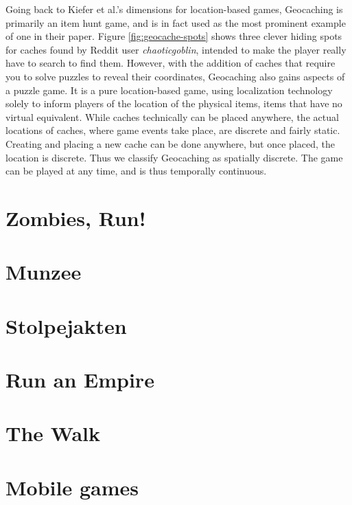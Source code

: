 Going back to Kiefer et al.'s \cite{kiefer2006systematically} dimensions for location-based games, Geocaching is primarily an item hunt game, and is in fact used as the most prominent example of one in their paper. Figure \ref{fig:geocache-spots} shows three clever hiding spots for caches found by Reddit user \emph{chaoticgoblin}, intended to make the player really have to search to find them. However, with the addition of caches that require you to solve puzzles to reveal their coordinates, Geocaching also gains aspects of a puzzle game. It is a pure location-based game, using localization technology solely to inform players of the location of the physical items, items that have no virtual equivalent. While caches technically can be placed anywhere, the actual locations of caches, where game events take place, are discrete and fairly static. Creating and placing a new cache can be done anywhere, but once placed, the location is discrete. Thus we classify Geocaching as spatially discrete. The game can be played at any time, and is thus temporally continuous.

\section{Zombies, Run!}

\section{Munzee}

\section{Stolpejakten}

\section{Run an Empire}

\section{The Walk}

\section{Mobile games}


